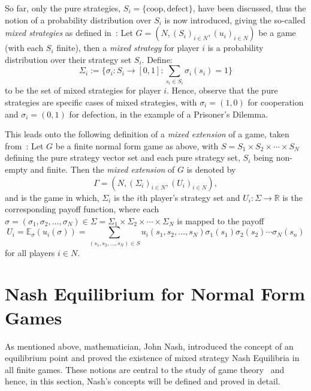 So far, only the pure strategies, \(S_{i}=\{\text{coop}, \text{defect}\}\), have
been discussed, thus the notion of a probability distribution over \(S_{i}\) is
now introduced, giving the so-called \textit{mixed strategies} as defined in~\cite{maschler_solan_zamir_2013}:
Let \(G=(N, (S_{i})_{i \in N}, (u_{i})_{i \in N})\) be a game (with each 
\(S_{i}\) finite), then a \textit{mixed strategy} for player \(i\) is a
probability distribution over their strategy set \(S_{i}\). Define:
\[
\Sigma_{i} := \{\sigma_{i} : S_{i} \to [0, 1] : \sum_{s_{i} \in S_{i}}{\sigma_{i}(s_{i})} = 1\}   
\]
to be the set of mixed strategies for player \(i\). Hence, observe that the pure
strategies are specific cases of mixed strategies, with \(\sigma_{i} = (1, 0)\)
for cooperation and \(\sigma_{i} = (0, 1)\) for defection, in the example of a
Prisoner's Dilemma.

This leads onto the following definition of a \emph{mixed extension} of a game,
taken from~\cite{maschler_solan_zamir_2013}:
Let \(G\) be a finite normal form game as above, with \(S = S_{1} \times
S_{2} \times \cdots \times S_{N}\) defining the pure strategy vector set and
each pure strategy set, \(S_{i}\) being non-empty and finite. Then the
\textit{mixed extension} of \(G\) is denoted by
\[
    \Gamma = (N, (\Sigma_{i})_{i \in N}, (U_{i})_{i \in N}),
\]
and is the game in which, \(\Sigma_{i}\) is the \(i\)th player's strategy set
and \(U_{i} : \Sigma \to \mathbb{R}\) is the corresponding payoff function,
where each \(\sigma = (\sigma_{1}, \sigma_{2}, \ldots, \sigma_{N}) \in \Sigma =
\Sigma_{1} \times \Sigma_{2} \times \cdots \times \Sigma_{N}\) is mapped to the
payoff
\begin{equation}

    U_{i} = \mathbb{E}_{\sigma}(u_{i}(\sigma)) = \sum_{(s_{1}, s_{2}, \ldots, s_{N}) \in S}{u_{i}(s_{1}, s_{2}, \ldots, s_{N})\sigma_{1}(s_{1})\sigma_{2}(s_{2})\cdots\sigma_{N}(s_{n})}
  
\end{equation}\label{eqn:mixed_payoff_function}
for all players \(i \in N\).

\section{Nash Equilibrium for Normal Form Games}\label{sec:NE_for_Normal_Form_Games}
As mentioned above, mathematician, John Nash, introduced the concept of an
equilibrium point and proved the existence of mixed strategy Nash Equilibria in
all finite games. These notions are central to the study of game
theory~\cite{maschler_solan_zamir_2013} and hence, in this section, Nash's
concepts will be defined and proved in detail.


